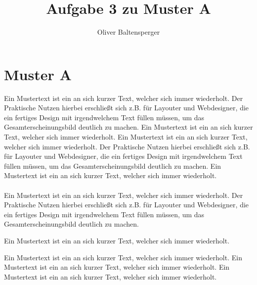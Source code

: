 \documentclass{article}
\title{Aufgabe 3 zu Muster A}
\author{Oliver Baltensperger}
\begin{document}
\maketitle

\section{Muster A}
Ein Mustertext ist ein an sich kurzer Text, welcher sich immer wiederholt. Der Praktische Nutzen hierbei erschließt sich z.B. für Layouter und Webdesigner, die ein fertiges Design mit irgendwelchem Text füllen müssen, um das Gesamterscheinungsbild deutlich zu machen. Ein Mustertext ist ein an sich kurzer Text, welcher sich immer wiederholt. Ein Mustertext ist ein an sich kurzer Text, welcher sich immer wiederholt. Der Praktische Nutzen hierbei erschließt sich z.B. für Layouter und Webdesigner, die ein fertiges Design mit irgendwelchem Text füllen müssen, um das
Gesamterscheinungsbild deutlich zu machen. Ein Mustertext ist ein an sich kurzer Text, welcher sich immer wiederholt.\citep{meusel2005entwicklung} \\
\\
Ein Mustertext ist ein an sich kurzer Text, welcher sich immer wiederholt. Der Praktische Nutzen hierbei erschließt sich z.B. für Layouter und Webdesigner, die ein fertiges Design mit irgendwelchem Text füllen müssen, um das Gesamterscheinungsbild deutlich zu machen.  \citep{hawking1993brief}

\begin{center}
Ein Mustertext ist ein an sich kurzer Text, welcher sich immer wiederholt. 
\end{center}

Ein Mustertext ist ein an sich kurzer Text, welcher sich immer wiederholt. Ein Mustertext ist ein an sich kurzer Text, welcher sich immer wiederholt. Ein Mustertext ist ein an sich kurzer Text, welcher sich immer wiederholt.\citep{nicolaou2013aufkommen} 


{}
\end{document}
